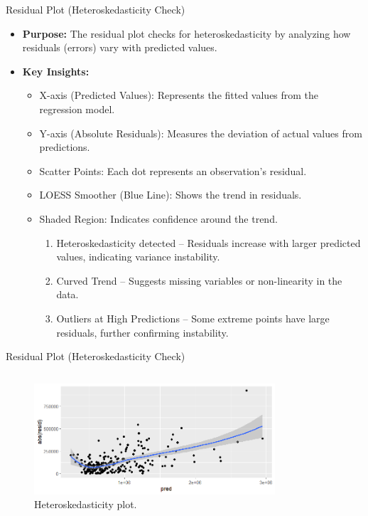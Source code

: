 \documentclass{beamer}
\begin{document}
		\begin{frame}{Residual Plot (Heteroskedasticity Check)}
		\begin{itemize}
			\item \textbf{Purpose:} The residual plot checks for heteroskedasticity by analyzing how residuals (errors) vary with predicted values.
			\item \textbf{Key Insights:}
			\begin{itemize}
				\item X-axis (Predicted Values): Represents the fitted values from the regression model.
				\item Y-axis (Absolute Residuals): Measures the deviation of actual values from predictions.
				\item Scatter Points: Each dot represents an observation’s residual.
				\item LOESS Smoother (Blue Line): Shows the trend in residuals.
				\item Shaded Region: Indicates confidence around the trend.
				\begin{enumerate}
					\item Heteroskedasticity detected – Residuals increase with larger predicted values, indicating variance instability.
					\item  Curved Trend – Suggests missing variables or non-linearity in the data.
					\item Outliers at High Predictions – Some extreme points have large residuals, further confirming instability.
				\end{enumerate}
			\end{itemize}
		\end{itemize}
	\end{frame}
	
	
		
	\begin{frame}{Residual Plot (Heteroskedasticity Check)}
		\begin{columns}
			
			\begin{figure}
				\includegraphics[width=0.8\textwidth]{residual_plot.png}
				\caption{Heteroskedasticity plot.}
			\end{figure}
		\end{columns}
	\end{frame}
	
\end{document}
